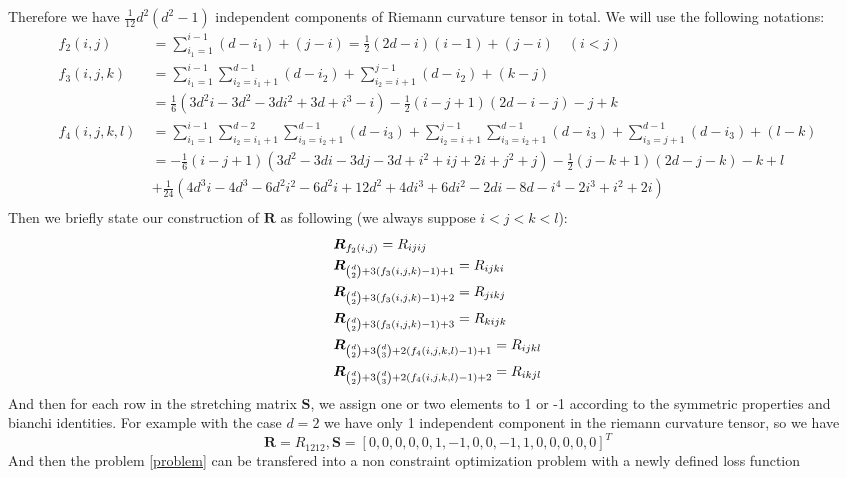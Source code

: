 \documentclass{article}
\begin{document}
Therefore we have $\frac{1}{12}d^2(d^2-1)$ independent components of Riemann curvature tensor in total. We will use the following notations:
\begin{align*}
f_2(i,j)\quad \quad & =\sum_{i_1=1}^{i-1}(d-i_1)+(j-i)=\frac{1}{2}(2d-i)(i-1)+(j-i)\quad(i<j) \\
f_3(i,j,k)\quad &= \sum_{i_1=1}^{i-1}\sum_{i_2=i_1+1}^{d-1}(d-i_2)+\sum_{i_2=i+1}^{j-1}(d-i_2)+(k-j) \\ &=\frac{1}{6} \left(3 d^2 i-3 d^2-3 d i^2+3 d+i^3-i\right)-\frac{1}{2} (i-j+1) (2
    d-i-j)-j+k \\
f_4(i,j,k,l) & = \sum_{i_1=1}^{i-1}\sum_{i_2=i_1+1}^{d-2}\sum_{i_3=i_2+1}^{d-1}(d-i_3) + \sum_{i_2=i+1}^{j-1}\sum_{i_3=i_2+1}^{d-1}(d-i_3)+\sum_{i_3=j+1}^{d-1}(d-i_3)+(l-k) \\ &=-\frac{1}{6} (i-j+1) \left(3 d^2-3 d i-3 d j-3 d+i^2+i j+2 i+j^2+j\right)-\frac{1}{2} (j-k+1) (2 d-j-k)-k+l\\&+\frac{1}{24}
   \left(4 d^3 i-4 d^3-6 d^2 i^2-6 d^2 i+12 d^2+4 d i^3+6 d i^2-2 d i-8 d-i^4-2 i^3+i^2+2
   i\right)\\
\end{align*}
Then we briefly state our construction of $\boldsymbol{R}$ as following (we always suppose $i<j<k<l$):
\begin{align}
\notag
&\boldsymbol{R}_{f_2(i,j)}=R_{ijij} \\
\notag
&\boldsymbol{R}_{\binom{d}{2}+3(f_3(i,j,k)-1)+1} = R_{ijki} \\
\notag
&\boldsymbol{R}_{\binom{d}{2}+3(f_3(i,j,k)-1)+2} = R_{jikj} \\
\notag
&\boldsymbol{R}_{\binom{d}{2}+3(f_3(i,j,k)-1)+3} = R_{kijk} \\
\notag
&\boldsymbol{R}_{\binom{d}{2}+3\binom{d}{3}+2(f_4(i,j,k,l)-1)+1} = R_{ijkl}\\
&\boldsymbol{R}_{\binom{d}{2}+3\binom{d}{3}+2(f_4(i,j,k,l)-1)+2} = R_{ikjl}
\end{align}
And then for each row in the stretching matrix $\boldsymbol{S}$, we assign one or two elements to 1 or -1 according to the symmetric properties and bianchi identities. For example with the case $d=2$ we have only 1 independent component in the riemann curvature tensor, so we have 
\begin{equation}
	\boldsymbol{R}=R_{1212},\boldsymbol{S}=[0,0,0,0,0,1,-1,0,0,-1,1,0,0,0,0,0]^T
\end{equation}
And then the problem \ref{problem} can be transfered into a non constraint optimization problem with a newly defined loss function
\end{document}

